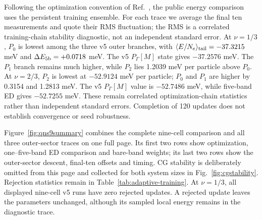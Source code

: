 Following the optimization convention of Ref.~\cite{luo}, the public energy
comparison uses the persistent training ensemble.  For each
trace we average the final ten measurements and quote their RMS fluctuation;
the RMS is a correlated training-chain stability diagnostic, not an
independent standard error. At $\nu=1/3$, $P_0$ is lowest among the three v5
outer branches, with $\langle E/N_e\rangle_{\rm tail}=-37.3215$ meV and
$\Delta E_{\rm 5b}=+0.0718$ meV. The v5 $P_\Gamma[M]$ state gives
$-37.2576$ meV. The $P_1$ branch remains much higher, while $P_2$ lies
1.2039 meV per particle above $P_0$. At $\nu=2/3$, $P_2$ is lowest at
$-52.9124$ meV per particle; $P_0$ and $P_1$ are higher by 0.3154 and
1.2813 meV. The v5 $P_\Gamma[M]$ value is $-52.7486$ meV, while five-band ED
gives $-52.7255$ meV. These remain correlated optimization-chain statistics
rather than independent standard errors. Completion of 120 updates does not
establish convergence or seed robustness.

Figure~\ref{fig:qns9summary} combines the complete nine-cell comparison and
all three outer-sector traces on one full page. Its first two rows show
optimization, one--five-band ED comparison and bare-band weights; its last two
rows show the outer-sector descent, final-ten offsets and timing. CG stability
is deliberately omitted from this page and collected for both system sizes in
Fig.~\ref{fig:cgstability}. Rejection statistics remain in
Table~\ref{tab:adaptive-training}. At $\nu=1/3$, all displayed nine-cell v5
runs have zero rejected updates. A rejected update leaves the parameters
unchanged, although its sampled local energy remains in the diagnostic trace.

